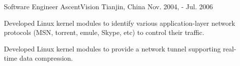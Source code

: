 \begin{cventries}
  \cventry
    {Software Engineer} %
    {AscentVision} %
    {Tianjin, China} %
    {Nov. 2004, - Jul. 2006} %
    {
      \begin{cvitems} %
        \item {Developed Linux kernel modules to identify various application-layer network protocols (MSN, torrent, emule, Skype, etc) to control their traffic.}
        \item {Developed Linux kernel modules to provide a network tunnel supporting real-time data compression.}
      \end{cvitems}
    }

\end{cventries}

